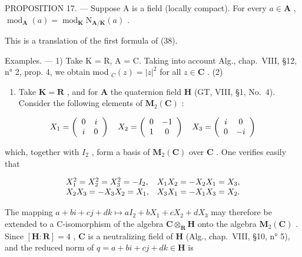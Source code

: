 PROPOSITION 17. --- Suppose A is a field (locally compact). For every \(a \in \mathbf{A}\) , \(\operatorname{mod}_{\mathbf{A}}(a) = \operatorname{mod}_{\mathbf{K}} \mathrm{N}_{\mathbf{A}/\mathbf{K}}(a)\) .

This is a translation of the first formula of (38).

Examples. --- 1) Take K = R, A = C. Taking into account Alg., chap.~VIII, §12, n° 2, prop. 4, we obtain mod \(_{C}(z) = |z|^{2}\) for all \(z \in \mathbf{C}\) . (2)

\begin{enumerate}
\def\labelenumi{\arabic{enumi})}
\setcounter{enumi}{1}
\tightlist
\item
  Take \(\mathbf{K} = \mathbf{R}\) , and for \(\mathbf{A}\) the quaternion field \(\mathbf{H}\) (GT, VIII, §1, No.~4). Consider the following elements of \(\mathbf{M}_2(\mathbf{C})\) :
\end{enumerate}

\[
X _ {1} = \left( \begin{array}{c c} 0 & i \\ i & 0 \end{array} \right) \quad X _ {2} = \left( \begin{array}{c c} 0 & - 1 \\ 1 & 0 \end{array} \right) \quad X _ {3} = \left( \begin{array}{c c} i & 0 \\ 0 & - i \end{array} \right)
\]

which, together with \(I_2\) , form a basis of \(\mathbf{M}_2(\mathbf{C})\) over \(\mathbf{C}\) . One verifies easily that

\[
\begin{array}{l l} {X _ {1} ^ {2} = X _ {2} ^ {2} = X _ {3} ^ {2} = - I _ {2},} & {X _ {1} X _ {2} = - X _ {2} X _ {1} = X _ {3},} \\ {X _ {2} X _ {3} = - X _ {3} X _ {2} = X _ {1},} & {X _ {3} X _ {1} = - X _ {1} X _ {3} = X _ {2}.} \end{array}
\]

The mapping \(a + bi + cj + dk \mapsto aI_2 + bX_1 + cX_2 + dX_3\) may therefore be extended to a C-isomorphism of the algebra \(\mathbf{C} \otimes_{\mathbf{R}} \mathbf{H}\) onto the algebra \(\mathbf{M}_2(\mathbf{C})\) . Since \([\mathbf{H} : \mathbf{R}] = 4\) , \(\mathbf{C}\) is a neutralizing field of \(\mathbf{H}\) (Alg., chap.~VIII, §10, n° 5), and the reduced norm of \(q = a + bi + cj + dk \in \mathbf{H}\) is

